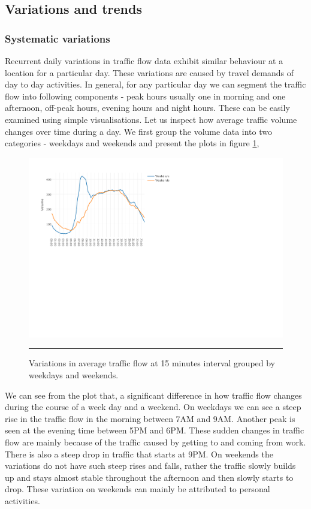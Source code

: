 \subsection{Variations and trends}

\subsubsection{Systematic variations}
Recurrent daily variations in traffic flow data exhibit similar behaviour at a location for
a particular day. These variations are caused by travel demands of day to day activities. In
general, for any particular day we can segment the traffic flow into following components -
peak hours usually one in morning and one afternoon, off-peak hours, evening hours and night hours.
These can be easily examined using simple visualisations. Let us inspect how average traffic volume
changes over time during a day. We first group the volume data into two categories - weekdays and
weekends and present the plots in figure \ref{fig:dailyVariations},

\begin{figure}[htbp]
    \centering
    \includegraphics[width=\textwidth]{Plots/average-day.pdf}
    \rule{35em}{0.5pt}
    \label{fig:averageDay}
  \caption[Average traffic flow on weekdays and weekends]{Variations in average traffic flow
  at 15 minutes interval grouped by weekdays and weekends.}
  \label{fig:dailyVariations}
\end{figure}

We can see from the plot that, a significant difference in how traffic flow changes during the
course of a week day and a weekend. On weekdays we can see a steep rise in the traffic flow in the
morning between 7AM and 9AM. Another peak is seen at the evening time between 5PM and 6PM. These
sudden changes in traffic flow are mainly because of the traffic caused by getting to and coming
from work. There is also a steep drop in traffic that starts at 9PM. On weekends the variations do
not have such steep rises and falls, rather the traffic slowly builds up and stays almost stable
throughout the afternoon and then slowly starts to drop. These variation on weekends can mainly be
attributed to personal activities.


